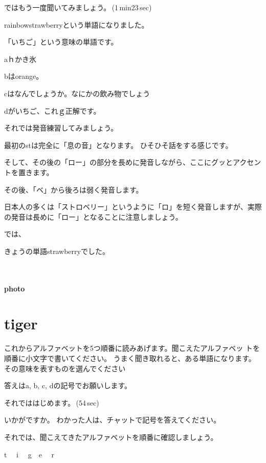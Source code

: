 \documentclass[12pt]{jlreq}
\begin{document}
ではもう一度聞いてみましょう。\faVolumeUp\,(1\,min23\,sec)

rainbowstrawberryという単語になりました。

「いちご」という意味の単語です。

aｈかき氷

bはorange。

cはなんでしょうか。なにかの飲み物でしょう

dがいちご、これｇ正解です。


それでは発音練習してみましょう。

最初のstは完全に「息の音」となります。
ひそひそ話をする感じです。

そして、その後の「ロー」の部分を長めに発音しながら、ここにグッとアクセントを置きます。

その後、「ベ」から後ろは弱く発音します。

日本人の多くは「ストロベリー」というように「ロ」を短く発音しますが、実際の発音は長めに「ロー」となることに注意しましょう。

では、

きょうの単語strawberryでした。

{\large \ComputerMouse}\,\,


\paragraph{photo}


\newpage
\section{tiger}

これからアルファベットを5つ順番に読みあげます。聞こえたアルファベッ
トを順番に小文字で書いてください。
うまく聞き取れると、ある単語になります。
その意味を表すものを選んでください

答えはa, b, c, dの記号でお願いします。

それでははじめます。\faVolumeUp\,(54\,sec)

いかがですか。
わかった人は、チャットで記号を答えてください。

それでは、聞こえてきたアルファベットを順番に確認しましょう。{\large \ComputerMouse}

t\,\,
{\large \ComputerMouse}\,\,
i\,\,
{\large \ComputerMouse}\,\,
g
{\large \ComputerMouse}\,\,
e\,\,
{\large \ComputerMouse}\,\,
r\,\,
\end{document}
